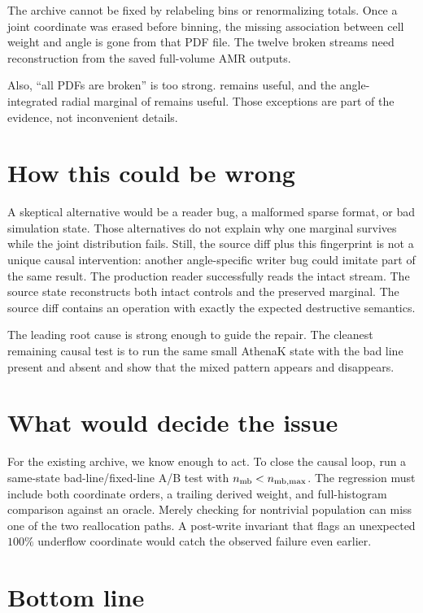 \documentclass[11pt]{article}
\begin{document}
The archive cannot be fixed by relabeling bins or renormalizing totals. Once a
joint coordinate was erased before binning, the missing association between
cell weight and angle is gone from that PDF file. The twelve broken streams
need reconstruction from the saved full-volume AMR outputs.

Also, ``all PDFs are broken'' is too strong.  remains useful,
and the angle-integrated radial marginal of  remains useful.
Those exceptions are part of the evidence, not inconvenient details.

\section{How this could be wrong}

A skeptical alternative would be a reader bug, a malformed sparse format, or
bad simulation state. Those alternatives do not explain why one marginal
survives while the joint distribution fails. Still, the source diff plus this
fingerprint is not a unique causal intervention: another angle-specific writer
bug could imitate part of the same result.
The production reader successfully reads the intact stream. The source state
reconstructs both intact controls and the preserved marginal. The source diff
contains an operation with exactly the expected destructive semantics.

The leading root cause is strong enough to guide the repair. The cleanest
remaining causal test is to run the same small AthenaK state with the bad line
present and absent and show that the mixed pattern appears and disappears.

\section{What would decide the issue}

For the existing archive, we know enough to act. To close the causal loop, run
a same-state bad-line/fixed-line A/B test with
\(n_{\rm mb}<n_{\rm mb,max}\). The regression must include both coordinate
orders, a trailing derived weight, and full-histogram comparison against an
oracle. Merely checking for nontrivial population can miss one of the two
reallocation paths. A post-write invariant that flags an unexpected \(100\%\)
underflow coordinate would catch the observed failure even earlier.

\section{Bottom line}
\end{document}

